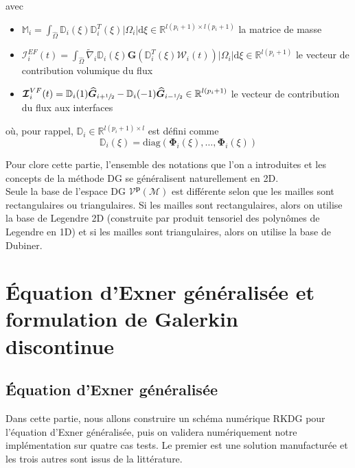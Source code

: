 \documentclass[11pt, a4paper, oneside]{report}
\begin{document}
avec
\begin{itemize}
    \item $\displaystyle \mathbb{M}_i = \int_{\widehat{\Omega}} \mathbb{D}_i(\xi) \mathbb{D}_i^T(\xi) \lvert \Omega_i \rvert \text{d}\xi \in \mathbb{R}^{l(p_i+1) \times l(p_i+1)}$ la matrice de masse
    \item $\displaystyle \bm{\mathcal{I}}_i^{EF}(t) = \int_{\widehat{\Omega}} \widetilde{\nabla}_i \mathbb{D}_i(\xi) \bm{G} \left( \mathbb{D}_i^T(\xi) \bm{\mathcal{W}}_i(t) \right) \lvert \Omega_i \rvert \text{d}\xi \in \mathbb{R}^{l(p_i+1)}$ le vecteur de contribution volumique du flux
    \item $\displaystyle \bm{\mathcal{I}}_i^{VF}(t) = \mathbb{D}_i(1) \bm{\widehat{G}}_{i+\sfrac{1}{2}} - \mathbb{D}_i(-1) \bm{\widehat{G}}_{i-\sfrac{1}{2}} \in \mathbb{R}^{l(p_i+1)}$ le vecteur de contribution du flux aux interfaces
\end{itemize}
où, pour rappel, $\mathbb{D}_i \in \mathbb{R}^{l(p_i+1) \times l}$ est défini comme
\[
    \mathbb{D}_i(\xi) = \text{diag}\left( \bm{\Phi}_i(\xi), \dots, \bm{\Phi}_i(\xi) \right)
\]

Pour clore cette partie, l'ensemble des notations que l'on a introduites et les concepts de la méthode DG se généralisent naturellement en 2D. \\
Seule la base de l'espace DG $\mathcal{V}^{\mathbf{p}}(\mathcal{M})$ est différente selon que les mailles sont rectangulaires ou triangulaires. Si les mailles sont rectangulaires, alors on utilise la base de Legendre 2D (construite par produit tensoriel des polynômes de Legendre en 1D) et si les mailles sont triangulaires, alors on utilise la base de Dubiner.

\chapter{Équation d'Exner généralisée et formulation de Galerkin discontinue}

\section{Équation d'Exner généralisée}

Dans cette partie, nous allons construire un schéma numérique RKDG pour l'équation d'Exner généralisée, puis on validera numériquement notre implémentation sur quatre cas tests. Le premier est une solution manufacturée et les trois autres sont issus de la littérature. \\
\end{document}
